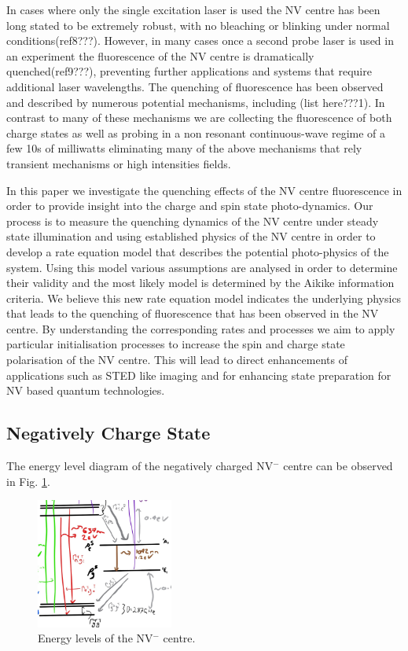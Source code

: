 \documentclass[preprint,prl,twocolumn]{revtex4}
\begin{document}
In cases where only the single excitation laser is used the NV centre has been long stated to be extremely robust, with no bleaching or blinking under normal conditions(ref8???). However, in many cases once a second probe laser is used in an experiment the fluorescence of the NV centre is dramatically quenched(ref9???), preventing further applications and systems that require additional laser wavelengths. The quenching of fluorescence has been observed and described by numerous potential mechanisms, including (list here???1). In contrast to many of these mechanisms we are collecting the fluorescence of both charge states as well as probing in a non resonant continuous-wave regime of a few 10s of milliwatts eliminating many of the above mechanisms that rely transient mechanisms or high intensities fields. 

In this paper we investigate the quenching effects of the NV centre fluorescence in order to provide insight into the charge and spin state photo-dynamics. Our process is to measure the quenching dynamics of the NV centre under steady state illumination and using established physics of the NV centre in order to develop a rate equation model that describes the potential photo-physics of the system. Using this model various assumptions are analysed in order to determine their validity and the most likely model is determined by the Aikike information criteria. We believe this new rate equation model indicates the underlying physics that leads to the quenching of fluorescence that has been observed in the NV centre. By understanding the corresponding rates and processes we aim to apply particular initialisation processes to increase the spin and charge state polarisation of the NV centre. This will lead to direct enhancements of applications such as STED like imaging and for enhancing state preparation for NV based quantum technologies.


\subsection{Negatively Charge State}
The energy level diagram of the negatively charged NV$^-$ centre  can be observed in Fig. \ref{FigEnergyLevelsNV-}.

\begin{figure}[H]
  \centering
  \includegraphics[width=0.4\textwidth]{NV-.jpg} 
 \caption{Energy levels of the NV$^-$ centre.} \label{FigEnergyLevelsNV-}
\end{figure}
\end{document}
